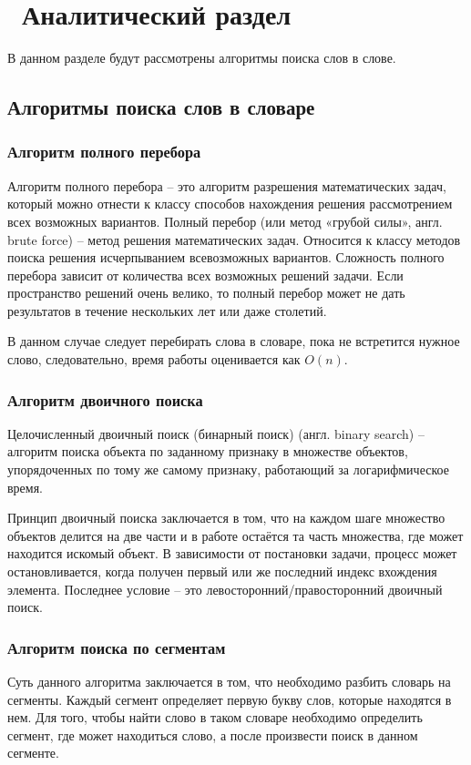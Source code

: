 \chapter{ Аналитический раздел}
\label{cha:analytical}
    В данном разделе будут рассмотрены 
    алгоритмы поиска слов в слове.

    \section{Алгоритмы поиска слов в словаре}
        \subsection{Алгоритм полного перебора}
            Алгоритм полного перебора -- это алгоритм разрешения математических задач,
            который можно отнести к классу способов нахождения решения рассмотрением
            всех возможных вариантов. 
            Полный перебор (или метод «грубой силы», англ. brute force) -- метод решения математических задач.
            Относится к классу методов поиска решения исчерпыванием всевозможных вариантов.
            Сложность полного перебора зависит от количества всех возможных решений задачи.
            Если пространство решений очень велико, то полный перебор может не дать результатов 
            в течение нескольких лет или даже столетий.
            
            В данном случае следует перебирать слова в словаре, 
            пока не встретится нужное слово, 
            следовательно, время работы оценивается как $ O(n)$.

        \subsection{Алгоритм двоичного поиска}
            Целочисленный двоичный поиск (бинарный поиск) (англ. binary search) -- алгоритм поиска
            объекта по заданному признаку в множестве объектов, упорядоченных по тому же самому признаку,
            работающий за логарифмическое время. 

            Принцип двоичный поиска заключается в том, 
            что на каждом шаге множество объектов делится на две части 
            и в работе остаётся та часть множества, 
            где может находится искомый объект. 
            В зависимости от постановки задачи,
            процесс может остановливается, 
            когда получен первый или же последний индекс вхождения элемента.
            Последнее условие -- это левосторонний/правосторонний двоичный поиск. 

        \subsection{Алгоритм поиска по сегментам}
            Суть данного алгоритма заключается в том,
            что необходимо разбить словарь на сегменты.
            Каждый сегмент определяет первую букву слов,
            которые находятся в нем. 
            Для того, чтобы найти слово в таком
            словаре необходимо определить сегмент, где может находиться слово,
            а после произвести поиск в данном сегменте.

\newpage